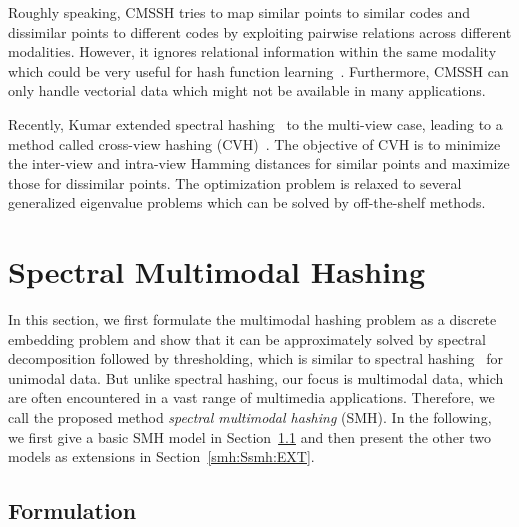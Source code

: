 Roughly speaking, \mbox{CMSSH} tries to map similar points to similar codes and dissimilar points to different codes by exploiting pairwise relations across different modalities. However, it ignores relational information within the same modality which could be very useful for hash function learning~\cite{weiss2008nips,he2010kdd}. Furthermore, \mbox{CMSSH} can only handle vectorial data which might not be available in many applications.

Recently, Kumar \etal extended spectral hashing~\cite{weiss2008nips} to the multi-view case, leading to a method called cross-view hashing (\mbox{CVH})~\cite{kumar2011ijcai}. The objective of \mbox{CVH} is to minimize the inter-view and intra-view Hamming distances for similar points and maximize those for dissimilar points. The optimization problem is relaxed to several generalized eigenvalue problems which can be solved by off-the-shelf methods.

\section{Spectral Multimodal Hashing}
\label{smh:SMH}

In this section, we first formulate the multimodal hashing problem as a discrete embedding problem and show that it can be approximately solved by spectral decomposition followed by thresholding, which is similar to spectral hashing~\cite{weiss2008nips} for unimodal data. But unlike spectral hashing, our focus is multimodal data, which are often encountered in a vast range of multimedia applications. Therefore, we call the proposed method \textit{spectral multimodal hashing} (\mbox{SMH}). In the following, we first give a basic \mbox{SMH} model in Section~\ref{smh:Ssmh:FORMULATION} and then present the other two models as extensions in Section~\ref{smh:Ssmh:EXT}.



\subsection{Formulation}
\label{smh:Ssmh:FORMULATION}

